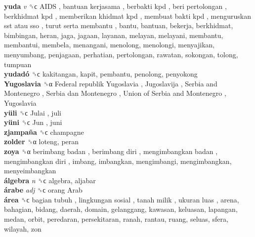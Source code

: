 \textbf{yuda} \emph{v}  ␝ϲ   AIDS ,  bantuan kerjasama ,  berbakti kpd ,  beri pertolongan ,  berkhidmat kpd ,  memberikan khidmat kpd ,  membuat bakti kpd ,  menguruskan sst atau sso ,  turut serta membantu , bantu, bantuan, bekerja, berkhidmat, bimbingan, heran, jaga, jagaan, layanan, melayan, melayani, membantu, membantui, membela, menangani, menolong, menolongi, menyajikan, menyumbang, penjagaan, perhatian, pertolongan, rawatan, sokongan, tolong, tumpuan  \\
\textbf{yudadó} ␝ϲ  kakitangan, kapit, pembantu, penolong, penyokong  \\
\textbf{Yugoslavia} ␝α   Federal republik Yugoslavia ,  Jugoslavija ,  Serbia and Montenegro ,  Serbia dan Montenegro ,  Union of Serbia and Montenegro ,  Yugoslavia   \\
\textbf{yüli} ␝ϲ   Julai , juli  \\
\textbf{yüni} ␝ϲ   Jun , juni  \\
\textbf{zjampaña} ␝ϲ  champagne  \\
\textbf{zolder} ␝α  loteng, peran  \\
\textbf{zoya} ␝α   berimbang badan ,  berimbang diri ,  mengimbangkan badan ,  mengimbangkan diri , imbang, imbangkan, mengimbangi, mengimbangkan, menyeimbangkan  \\
\textbf{álgebra} \emph{n}  ␝ϲ  algebra, aljabar  \\
\textbf{árabe} \emph{adj}  ␝ϲ   orang Arab   \\
\textbf{área} ␝ϲ   bagian tubuh ,  lingkungan sosial ,  tanah milik ,  ukuran luas , arena, bahagian, bidang, daerah, domain, gelanggang, kawasan, keluasan, lapangan, medan, orbit, peredaran, persekitaran, ranah, rantau, ruang, seluas, sfera, wilayah, zon  \\
